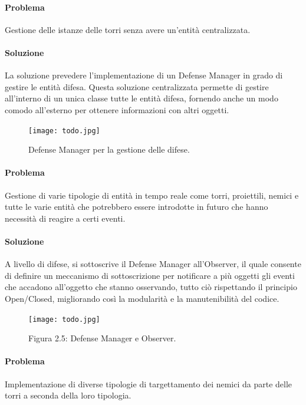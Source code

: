 \documentclass[a4paper,12pt]{report}
\begin{document}
\paragraph{Problema}
Gestione delle istanze delle torri senza avere un'entità centralizzata.
\paragraph{Soluzione}
La soluzione prevedere l'implementazione di un Defense Manager in grado di gestire le entità difesa. Questa soluzione centralizzata permette di gestire all'interno di un unica classe tutte le entità difesa, fornendo anche un modo comodo all'esterno per ottenere informazioni con altri oggetti.

\begin{figure}[H]
    \centering
    \texttt{[image: todo.jpg]}
    \caption{Defense Manager per la gestione delle difese.}
    \label{fig:defense-manager}
\end{figure}

\vspace{50mm}
\paragraph{Problema}
Gestione di varie tipologie di entità in tempo reale come torri, proiettili, nemici e tutte le varie entità che potrebbero essere introdotte in futuro che hanno necessità di reagire a certi eventi.
\paragraph{Soluzione}
A livello di difese, si sottoscrive il Defense Manager all'Observer, il quale consente di definire un meccanismo di sottoscrizione per notificare a più oggetti gli eventi che accadono all'oggetto che stanno osservando, tutto ciò rispettando il principio Open/Closed, migliorando così la modularità e la manutenibilità del codice.

\begin{figure}[H]
    \centering
    \texttt{[image: todo.jpg]}
    \caption{Figura 2.5: Defense Manager e Observer.}
    \label{fig:defense-observer}
\end{figure}
\vspace{50mm}


\paragraph{Problema}
Implementazione di diverse tipologie di targettamento dei nemici da parte delle torri a seconda della loro tipologia.
\end{document}
